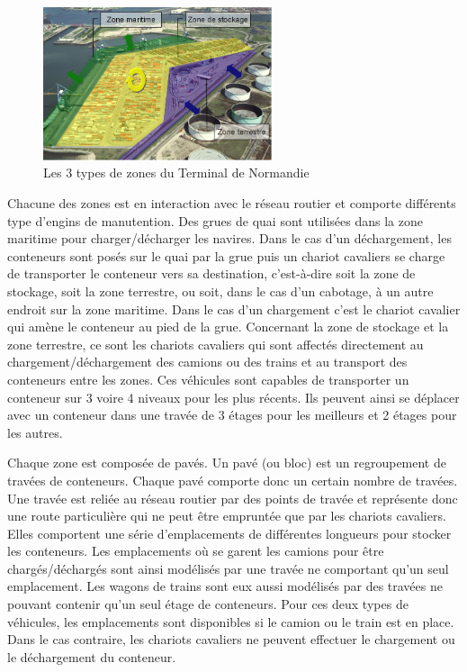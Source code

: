 \begin{figure}[h]
 \centering
 \includegraphics[width=0.6\textwidth]{chapitres/simulation/3zonesDuTN.png}
 \caption{Les 3 types de zones du Terminal de Normandie}
 \label{fig:simulation:3zones}
\end{figure}

Chacune des zones est en interaction avec le réseau routier et comporte différents type d'engins de manutention. Des grues de quai sont utilisées dans la zone maritime pour charger/décharger les navires. Dans le cas d'un déchargement, les conteneurs sont posés sur le quai par la grue puis un chariot cavaliers se charge de transporter le conteneur vers sa destination, c'est-à-dire soit la zone de stockage, soit la zone terrestre, ou soit, dans le cas d'un cabotage, à un autre endroit sur la zone maritime. Dans le cas d'un chargement c'est le chariot cavalier qui amène le conteneur au pied de la grue. Concernant la zone de stockage et la zone terrestre, ce sont les chariots cavaliers qui sont affectés directement au chargement/déchargement des camions ou des trains et au transport des conteneurs entre les zones. Ces véhicules sont capables de transporter un conteneur sur 3 voire 4 niveaux pour les plus récents. Ils peuvent ainsi se déplacer avec un conteneur dans une travée de 3 étages pour les meilleurs et 2 
étages pour les autres.

Chaque zone est composée de pavés. Un pavé (ou bloc) est un regroupement de travées de conteneurs. Chaque pavé comporte donc un certain nombre de travées. Une travée est reliée au réseau routier par des points de travée et représente donc une route particulière qui ne peut être empruntée que par les chariots cavaliers. Elles comportent une série d'emplacements de différentes longueurs pour stocker les conteneurs. Les emplacements où se garent les camions pour être chargés/déchargés sont ainsi modélisés par une travée ne comportant qu'un seul emplacement. Les wagons de trains sont eux aussi modélisés par des travées ne pouvant contenir qu'un seul étage de conteneurs. Pour ces deux types de véhicules, les emplacements sont disponibles si le camion ou le train est en place. Dans le cas contraire, les chariots cavaliers ne peuvent effectuer le chargement ou le déchargement du conteneur.

